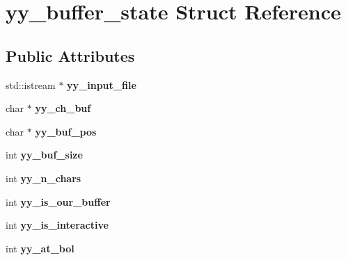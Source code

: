 \hypertarget{structyy__buffer__state}{}\section{yy\+\_\+buffer\+\_\+state Struct Reference}
\label{structyy__buffer__state}
\subsection*{Public Attributes}
\begin{DoxyCompactItemize}
\item 
std\+::istream $\ast$ {\bfseries yy\+\_\+input\+\_\+file}\hypertarget{structyy__buffer__state_a3cea2f85a5c18fae4a8dd1ca44c3a977}{}\label{structyy__buffer__state_a3cea2f85a5c18fae4a8dd1ca44c3a977}

\item 
char $\ast$ {\bfseries yy\+\_\+ch\+\_\+buf}\hypertarget{structyy__buffer__state_ad7b8df8d8a4688e57b0b8d3ca75adc85}{}\label{structyy__buffer__state_ad7b8df8d8a4688e57b0b8d3ca75adc85}

\item 
char $\ast$ {\bfseries yy\+\_\+buf\+\_\+pos}\hypertarget{structyy__buffer__state_a58aa927f098b99d99e75da80f9b681ef}{}\label{structyy__buffer__state_a58aa927f098b99d99e75da80f9b681ef}

\item 
int {\bfseries yy\+\_\+buf\+\_\+size}\hypertarget{structyy__buffer__state_a451d39697f006f3922c1f43cf79286b4}{}\label{structyy__buffer__state_a451d39697f006f3922c1f43cf79286b4}

\item 
int {\bfseries yy\+\_\+n\+\_\+chars}\hypertarget{structyy__buffer__state_a06406208824817acfec2183b79080945}{}\label{structyy__buffer__state_a06406208824817acfec2183b79080945}

\item 
int {\bfseries yy\+\_\+is\+\_\+our\+\_\+buffer}\hypertarget{structyy__buffer__state_a80ce2431c70dc4f89ced487f18449465}{}\label{structyy__buffer__state_a80ce2431c70dc4f89ced487f18449465}

\item 
int {\bfseries yy\+\_\+is\+\_\+interactive}\hypertarget{structyy__buffer__state_abf5c70eea75581b58c0ee7bd31b14490}{}\label{structyy__buffer__state_abf5c70eea75581b58c0ee7bd31b14490}

\item 
int {\bfseries yy\+\_\+at\+\_\+bol}\hypertarget{structyy__buffer__state_a9d60c60af6e1a6f69de16871fd64f85f}{}\label{structyy__buffer__state_a9d60c60af6e1a6f69de16871fd64f85f}


\end{DoxyCompactItemize}
